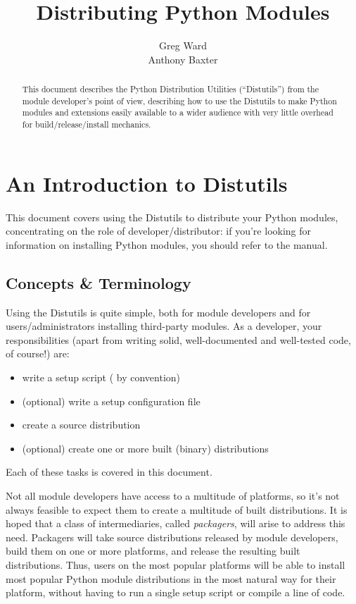\documentclass{manual}
\title{Distributing Python Modules}
\author{Greg Ward\\
        Anthony Baxter}
\begin{document}
\maketitle
\begin{abstract}
  \noindent
  This document describes the Python Distribution Utilities
  (``Distutils'') from the module developer's point of view, describing
  how to use the Distutils to make Python modules and extensions easily
  available to a wider audience with very little overhead for
  build/release/install mechanics.
\end{abstract}

%
\tableofcontents


\chapter{An Introduction to Distutils}
\label{intro}

This document covers using the Distutils to distribute your Python
modules, concentrating on the role of developer/distributor: if
you're looking for information on installing Python modules, you
should refer to the  manual.


\section{Concepts \& Terminology}
\label{concepts}

Using the Distutils is quite simple, both for module developers and for
users/administrators installing third-party modules.  As a developer,
your responsibilities (apart from writing solid, well-documented and
well-tested code, of course!) are:
\begin{itemize}
\item write a setup script ( by convention)
\item (optional) write a setup configuration file
\item create a source distribution
\item (optional) create one or more built (binary) distributions
\end{itemize}
Each of these tasks is covered in this document.

Not all module developers have access to a multitude of platforms, so
it's not always feasible to expect them to create a multitude of built
distributions.  It is hoped that a class of intermediaries, called
\emph{packagers}, will arise to address this need.  Packagers will take
source distributions released by module developers, build them on one or
more platforms, and release the resulting built distributions.  Thus,
users on the most popular platforms will be able to install most popular
Python module distributions in the most natural way for their platform,
without having to run a single setup script or compile a line of code.
\end{document}

